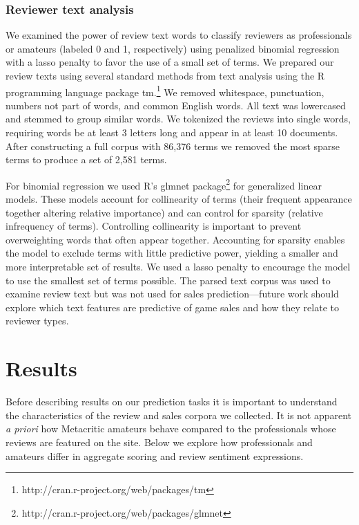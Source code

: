 \documentclass{sig-alternate}
\begin{document}
\subsubsection{Reviewer text analysis}
We examined the power of review text words to classify reviewers as professionals or amateurs (labeled 0 and 1, respectively) using penalized binomial regression with a lasso penalty to favor the use of a small set of terms.
We prepared our review texts using several standard methods from text analysis using the R programming language package tm.\footnote{http://cran.r-project.org/web/packages/tm} We removed whitespace, punctuation, numbers not part of words, and common English words. All text was lowercased and stemmed to group similar words. We tokenized the reviews into single words, requiring words be at least 3 letters long and appear in at least 10 documents. After constructing a full corpus with 86,376 terms we removed the most sparse terms to produce a set of 2,581 terms.

For binomial regression we used R's glmnet package\footnote{http://cran.r-project.org/web/packages/glmnet} for generalized linear models. These models account for collinearity of terms (their frequent appearance together altering relative importance) and can control for sparsity (relative infrequency of terms). Controlling collinearity is important to prevent overweighting words that often appear together. Accounting for sparsity enables the model to exclude terms with little predictive power, yielding a smaller and more interpretable set of results. We used a lasso penalty to encourage the model to use the smallest set of terms possible. The parsed text corpus was used to examine review text but was not used for sales prediction---future work should explore which text features are predictive of game sales and how they relate to reviewer types.



\section{Results}
Before describing results on our prediction tasks it is important to understand the characteristics of the review and sales corpora we collected. It is not apparent \textit{a priori} how Metacritic amateurs behave compared to the professionals whose reviews are featured on the site. Below we explore how professionals and amateurs differ in aggregate scoring and review sentiment expressions.
\end{document}
